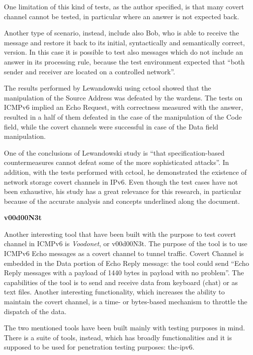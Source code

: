 \documentclass[12pt]{article}
\begin{document}
One limitation of this kind of tests, as the author specified, is that many covert channel cannot be tested, in particular where an answer is not expected back.

Another type of scenario, instead, include also Bob, who is able to receive the message and restore it back to its initial, syntactically and semantically correct, version. In this case it is possible to test also messages which do not include an answer in its processing rule, because the test environment expected that ``both sender and receiver are located on a controlled network''\cite{lewandowski}.

The results performed by Lewandowski using cctool showed that the manipulation of the Source Address was defeated by the wardens. The tests on ICMPv6 implied an Echo Request, with correctness measured with the answer, resulted in a half of them defeated in the case of the manipulation of the Code field, while the covert channels were successful in case of the Data field manipulation.

One of the conclusions of Lewandowski study is ``that specification-based countermeasures cannot defeat some of the more sophisticated attacks''. In addition, with the tests performed with cctool, he demonstrated the existence of network storage covert channels in IPv6. Even though the test cases have not been exhaustive, his study has a great relevance for this research, in particular because of the accurate analysis and concepts underlined along the document\cite{lewandowski}.

\textbf{v00d00N3t}

Another interesting tool that have been built with the purpose to test covert channel in ICMPv6 is \textit{Voodonet}, or v00d00N3t. The purpose of the tool is to use ICMPv6 Echo messages as a covert channel to tunnel traffic. Covert Channel is embedded in the Data portion of Echo Reply message: the tool could send ``Echo Reply messages with a  payload of 1440 bytes in payload with no problem''. The capabilities of the tool is to send and receive data from keyboard (chat) or as text files. Another interesting functionality, which increases the ability to maintain the covert channel, is a time- or bytes-based mechanism to throttle the dispatch of the data\cite{voodoo}.

The two mentioned tools have been built mainly with testing purposes in mind. There is a suite of tools, instead, which has broadly functionalities and it is supposed to be used for penetration testing purposes: thc-ipv6.
\end{document}

